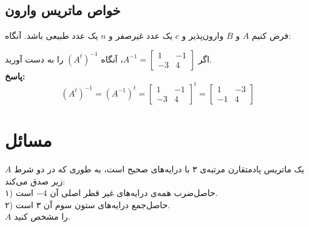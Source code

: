 \subsection{خواص ماتریس وارون}
فرض کنیم $A$ و $B$ وارون‌پذیر و $c$ یک عدد غیرصفر و $n$ یک عدد طبیعی باشد. آنگاه:
\vspace*{-0.5cm}

\begin{example}
	اگر
	$A^{-1}=
	\begin{bmatrix}
		1 & -1 \\
		-3 & 4
	\end{bmatrix}$،
	آنگاه
	$(A^t)^{-1}$
	را به دست آورید. \\
	\textbf{پاسخ:}
	\[
	(A^t)^{-1}=(A^{-1})^t=
	\begin{bmatrix}
		1 & -1 \\
		-3 & 4
	\end{bmatrix}^t
	=
	\begin{bmatrix}
		1 & -3 \\
		-1 & 4
	\end{bmatrix}
	\]
	
\end{example}

\section{مسائل}

\begin{problem} \label{prmat1}
	$A$
	یک ماتریس پادمتقارن مرتبه‌ی ۳ با درایه‌های صحیح است، به طوری که در دو شرط زیر صدق می‌کند: \\
	۱) حاصل‌ضرب همه‌ی درایه‌های غیر قطر اصلی آن $-4$ است. \\
	۲) حاصل‌جمع درایه‌های ستون سوم آن ۳ است. \\
	$A$
	را مشخص کنید.
\end{problem}

